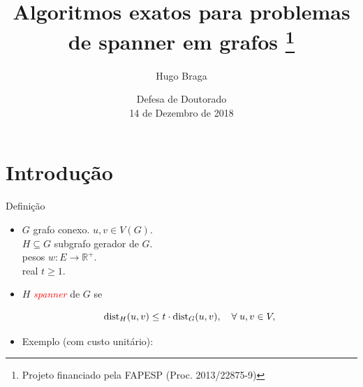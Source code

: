 \documentclass[dvipsnames]{beamer}
\title[Spanners]
      {Algoritmos exatos para problemas de spanner em grafos
      \thanks{Projeto financiado pela FAPESP (Proc. 2013/22875-9)}}
\author[hugo]
       {Hugo Braga}
\institute[USP]
{
 Instituto de Matem\'{a}tica e Estat\'{i}stica\\
 Universidade de S\~{a}o Paulo\\
 Orientadora: Prof. Yoshiko Wakabayashi
}
\date[Short Occasion]
{Defesa de Doutorado \\ 14 de Dezembro de 2018  }
\newcommand{\dist}{{\rm dist}}
\newcommand{\R}{\mathbb{R}}
\begin{document}
\begin{frame}
 \titlepage
\end{frame}


\section{Introdução}

\begin{frame}{Definição}

\begin{itemize}
 \item $G$ grafo conexo. $u,v \in V(G)$.\\
   $H \subseteq G$ subgrafo gerador de $G$.\\
   pesos $w: E \to \mathbb{R}^+$.\\
   real $t \ge 1$.
 \item $H$ \textcolor{red}{\emph{spanner}} de $G$ se 

\begin{equation}
  \dist_{H}(u,v) \le t \cdot \dist_{G}(u,v), \quad \forall\;u,v \in V,
  \label{eq:def_spanner}
\end{equation}



\item Exemplo (com custo unitário):

    

\begin{figure}
  \centering
\end{figure}
\end{itemize}
\end{frame}
\end{document}
